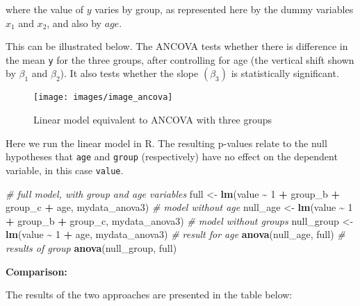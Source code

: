 \documentclass[
  12pt,
]{krantz}
\newenvironment{Shaded}{\begin{snugshade}}{\end{snugshade}}
\newcommand{\CommentTok}[1]{\textcolor[rgb]{0.56,0.35,0.01}{\textit{#1}}}
\newcommand{\DecValTok}[1]{\textcolor[rgb]{0.00,0.00,0.81}{#1}}
\newcommand{\KeywordTok}[1]{\textcolor[rgb]{0.13,0.29,0.53}{\textbf{#1}}}
\newcommand{\NormalTok}[1]{#1}
\newcommand{\OperatorTok}[1]{\textcolor[rgb]{0.81,0.36,0.00}{\textbf{#1}}}
\newcommand{\StringTok}[1]{\textcolor[rgb]{0.31,0.60,0.02}{#1}}
\begin{document}
where the value of \(y\) varies by group, as represented here by the dummy variables \(x_1\) and \(x_2\), and also by \(age\).

This can be illustrated below. The ANCOVA tests whether there is difference in the mean \texttt{y} for the three groups, after controlling for age (the vertical shift shown by \(\beta_1\) and \(\beta_2\)). It also tests whether the slope \((\beta_3)\) is statistically significant.

\begin{figure}

{\centering \texttt{[image: images/image\_ancova]} 

}

\caption{Linear model equivalent to ANCOVA with three groups}\label{fig:unnamed-chunk-52}
\end{figure}

Here we run the linear model in R. The resulting p-values relate to the null hypotheses that \texttt{age} and \texttt{group} (respectively) have no effect on the dependent variable, in this case \texttt{value}.

\begin{Shaded}
\begin{Highlighting}[]
\CommentTok{\# full model, with group and age variables}
\NormalTok{full \textless{}{-}}\StringTok{ }\KeywordTok{lm}\NormalTok{(value }\OperatorTok{\textasciitilde{}}\StringTok{ }\DecValTok{1} \OperatorTok{+}\StringTok{ }\NormalTok{group\_b }\OperatorTok{+}\StringTok{ }\NormalTok{group\_c }\OperatorTok{+}\StringTok{ }\NormalTok{age, mydata\_anova3)}
\CommentTok{\# model without age}
\NormalTok{null\_age \textless{}{-}}\StringTok{ }\KeywordTok{lm}\NormalTok{(value }\OperatorTok{\textasciitilde{}}\StringTok{ }\DecValTok{1} \OperatorTok{+}\StringTok{ }\NormalTok{group\_b }\OperatorTok{+}\StringTok{ }\NormalTok{group\_c, mydata\_anova3)}
\CommentTok{\# model without groups}
\NormalTok{null\_group \textless{}{-}}\StringTok{ }\KeywordTok{lm}\NormalTok{(value }\OperatorTok{\textasciitilde{}}\StringTok{ }\DecValTok{1} \OperatorTok{+}\StringTok{ }\NormalTok{age, mydata\_anova3)}
\CommentTok{\# result for age}
\KeywordTok{anova}\NormalTok{(null\_age, full)}
\CommentTok{\# results of group}
\KeywordTok{anova}\NormalTok{(null\_group, full)}
\end{Highlighting}
\end{Shaded}

\textbf{Comparison:}

The results of the two approaches are presented in the table below:
\end{document}
